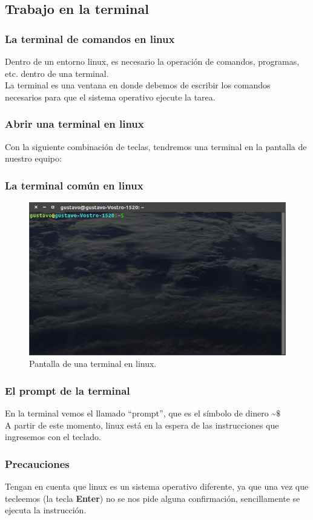 \subsection{Trabajo en la terminal}
\begin{frame}
\frametitle{La terminal de comandos en linux}
Dentro de un entorno linux, es necesario la operación de comandos, programas, etc. dentro de una terminal.
\\
\bigskip
La terminal es una ventana en donde debemos de escribir los comandos necesarios para que el sistema operativo ejecute la tarea.
\end{frame}
\begin{frame}
\frametitle{Abrir una terminal en linux}
Con la siguiente combinación de teclas, tendremos una terminal en la pantalla de nuestro equipo:
\\
\bigskip
\bigskip
\begin{center}
\end{center}
\end{frame}
\begin{frame}
\frametitle{La terminal común en linux}
\begin{figure}
	\centering
	\includegraphics[scale=0.4]{Terminal_01}
	\caption{Pantalla de una terminal en linux.}
\end{figure}
\end{frame}
\begin{frame}
\frametitle{El prompt de la terminal}
En la terminal vemos el llamado \enquote{prompt}, que es el símbolo de dinero  \textasciitilde $\$$
\\
\bigskip
A partir de este momento, linux está en la espera de las instrucciones que ingresemos con el teclado.
\end{frame}
\begin{frame}
\frametitle{Precauciones}
Tengan en cuenta que linux es un sistema operativo diferente, ya que una vez que tecleemos \keys{\return} (la tecla \textbf{Enter}) no se nos pide alguna confirmación, sencillamente se ejecuta la instrucción.
\end{frame}
